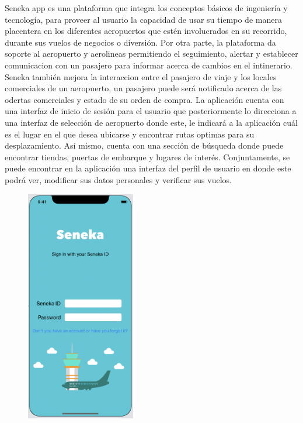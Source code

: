 \documentclass[]{article}
\begin{document}
Seneka app es una plataforma que integra los conceptos básicos de ingeniería y tecnología, para proveer al usuario la capacidad de usar su tiempo de manera placentera en los diferentes aeropuertos que estén involucrados en su recorrido, durante sus vuelos de negocios o diversión. Por otra parte, la plataforma da soporte al aeropuerto y aerolineas permitiendo el seguimiento, alertar y establecer comunicacion con un pasajero para informar acerca de cambios en el intinerario. Seneka también mejora la interaccion entre el pasajero de viaje y los locales comerciales de un aeropuerto, un pasajero puede será notificado acerca de las odertas comerciales y estado de su orden de compra. La aplicación cuenta con una interfaz de inicio de sesión para el usuario que posteriormente lo direcciona a una interfaz de selección de aeropuerto donde este, le indicará a la aplicación cuál es el lugar en el que desea ubicarse y encontrar rutas optimas para su desplazamiento. Así mismo, cuenta con una sección de búsqueda donde puede encontrar tiendas, puertas de embarque y lugares de interés. Conjuntamente, se puede encontrar en la aplicación una interfaz del perfil de usuario en donde este podrá ver, modificar sus datos personales y verificar sus vuelos.

\begin{figure}[H]
\centering
\includegraphics[height=4.0in]{Figura_1.jpg}
\end{figure}
\end{document}
